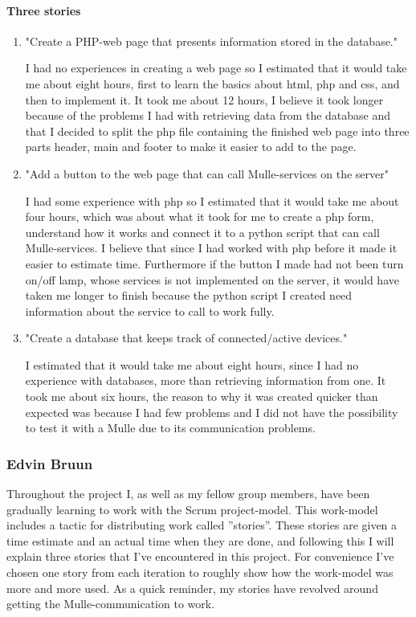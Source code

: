 \paragraph{Three stories}
\begin{enumerate}
\item{"Create a PHP-web page that presents information stored in the database."}

I had no experiences in creating a web page so I estimated that it would take me about eight hours, first to learn the basics about html, php and css, and then to implement it. It took me
about 12 hours, I believe it took longer because of the problems I had with retrieving data from the database and that I decided to split the php file containing the finished web page
into three parts header, main and footer to make it easier to add to the page. 

\item {"Add a button to the web page that can call Mulle-services on the server"}

I had some experience with php so I estimated that it would take me about four hours, which was about what it took for me to create a php form, understand how it works and connect it to a
python script that can call Mulle-services. I believe that since I had worked with php before it made it easier to estimate time. Furthermore if the  button I made had not been turn on/off
lamp, whose services is not implemented on the server, it would have taken me longer to finish because the python script I created need information about the service to call to work
fully. 

\item {"Create a database that keeps track of connected/active devices."}

I estimated that it would take me about eight hours, since I had no experience with databases, more than retrieving information from one. It took me about six hours, the reason to why it was
created quicker than expected was because I had few problems and I did not have the possibility to test it with a Mulle due to its communication problems.
 
\end{enumerate}	
\subsubsection{Edvin Bruun}
Throughout the project I, as well as my fellow group members, have been gradually learning to work with the Scrum project-model.
This work-model includes a tactic for distributing work called ''stories''. These stories are given a time estimate and an actual time when they are done, 
and following this I will explain three stories that I've encountered in this project. 
For convenience I've chosen one story from each iteration to roughly show how the work-model was more and more used. As a quick reminder, my stories have revolved around getting the Mulle-communication to work.

